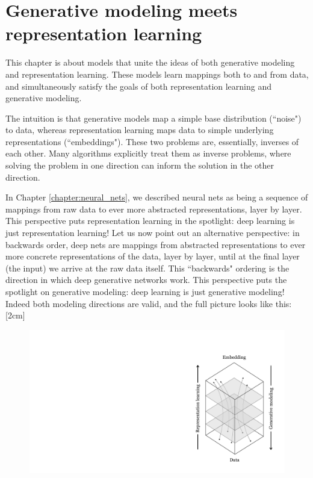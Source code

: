 \chapter{Generative modeling meets representation learning}\label{chapter:generative_modeling_and_representation_learning}

This chapter is about models that unite the ideas of both generative modeling and representation learning. These models learn mappings both to and from data, and simultaneously satisfy the goals of both representation learning and generative modeling.

The intuition is that generative models map a simple base distribution (``noise") to data, whereas representation learning maps data to simple underlying representations (``embeddings"). These two problems are, essentially, inverses of each other. Many algorithms explicitly treat them as inverse problems, where solving the problem in one direction can inform the solution in the other direction.

In Chapter \ref{chapter:neural_nets}, we described neural nets as being a sequence of mappings from raw data to ever more abstracted representations, layer by layer. This perspective puts representation learning in the spotlight: deep learning is just representation learning! Let us now point out an alternative perspective: in backwards order, deep nets are mappings from abstracted representations to ever more concrete representations of the data, layer by layer, until at the final layer (the input) we arrive at the raw data itself. This ``backwards" ordering is the direction in which deep generative networks work. This perspective puts the spotlight on generative modeling: deep learning is just generative modeling! Indeed both modeling directions are valid, and the full picture looks like this:[2cm]
\begin{figure}[h!]
    \centering
    \includegraphics[width=0.4\linewidth]{./figures/generative_modeling_and_representation_learning/rep_gen_schematic.pdf}
    \label{fig:generative_modeling_and_representation_learning:rep_gen_schematic}
\end{figure}

